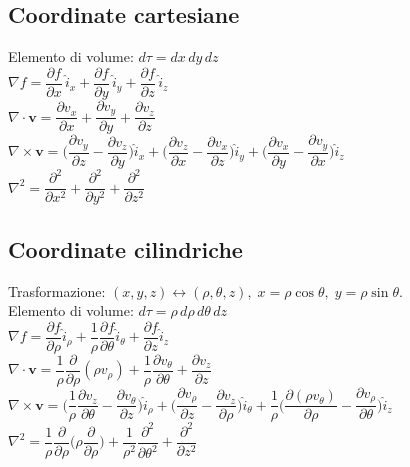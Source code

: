 \documentclass{book}
\begin{document}
\subsection*{Coordinate cartesiane}
Elemento di volume: $d\tau=dx\,dy\,dz$\\[6pt]
$\nabla f=\dfrac{\partial f}{\partial x}\,\hat{i}_x+\dfrac{\partial f}{\partial y}\,\hat{i}_y+\dfrac{\partial f}{\partial z}\,\hat{i}_z$\\[6pt]
$\nabla\cdot\mathbf{v}=\dfrac{\partial v_x}{\partial x}+\dfrac{\partial v_y}{\partial y}+\dfrac{\partial v_z}{\partial z}$\\[6pt]
$\nabla\times\mathbf{v}=\big(\dfrac{\partial v_y}{\partial z}-\dfrac{\partial v_z}{\partial y}\big)\hat{i}_x+\big(\dfrac{\partial v_z}{\partial x}-\dfrac{\partial v_x}{\partial z}\big)\hat{i}_y+\big(\dfrac{\partial v_x}{\partial y}-\dfrac{\partial v_y}{\partial x}\big)\hat{i}_z$\\[6pt]
$\nabla^2=\dfrac{\partial^2}{\partial x^2}+\dfrac{\partial^2}{\partial y^2}+\dfrac{\partial^2}{\partial z^2}$

\subsection*{Coordinate cilindriche}
Trasformazione: $(x,y,z)\leftrightarrow(\rho,\theta,z),\;x=\rho\cos\theta,\;y=\rho\sin\theta$.\\[6pt]
Elemento di volume: $d\tau=\rho\,d\rho\,d\theta\,dz$\\[6pt]
$\nabla f=\dfrac{\partial f}{\partial\rho}\hat{i}_\rho+\dfrac{1}{\rho}\dfrac{\partial f}{\partial\theta}\hat{i}_\theta+\dfrac{\partial f}{\partial z}\hat{i}_z$\\[6pt]
$\nabla\cdot\mathbf{v}=\dfrac{1}{\rho}\dfrac{\partial}{\partial\rho}(\rho v_\rho)+\dfrac{1}{\rho}\dfrac{\partial v_\theta}{\partial\theta}+\dfrac{\partial v_z}{\partial z}$\\[6pt]
$\nabla\times\mathbf{v}=\big(\dfrac{1}{\rho}\dfrac{\partial v_z}{\partial\theta}-\dfrac{\partial v_\theta}{\partial z}\big)\hat{i}_\rho+\big(\dfrac{\partial v_\rho}{\partial z}-\dfrac{\partial v_z}{\partial\rho}\big)\hat{i}_\theta+\dfrac{1}{\rho}\big(\dfrac{\partial(\rho v_\theta)}{\partial\rho}-\dfrac{\partial v_\rho}{\partial\theta}\big)\hat{i}_z$\\[6pt]
$\nabla^2=\dfrac{1}{\rho}\dfrac{\partial}{\partial\rho}\Big(\rho\dfrac{\partial}{\partial\rho}\Big)+\dfrac{1}{\rho^2}\dfrac{\partial^2}{\partial\theta^2}+\dfrac{\partial^2}{\partial z^2}$
\end{document}

